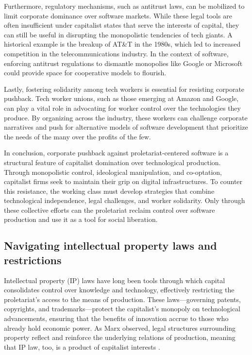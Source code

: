 \begin{refsection}
Furthermore, regulatory mechanisms, such as antitrust laws, can be mobilized to limit corporate dominance over software markets. While these legal tools are often insufficient under capitalist states that serve the interests of capital, they can still be useful in disrupting the monopolistic tendencies of tech giants. A historical example is the breakup of AT\&T in the 1980s, which led to increased competition in the telecommunications industry. In the context of software, enforcing antitrust regulations to dismantle monopolies like Google or Microsoft could provide space for cooperative models to flourish.

Lastly, fostering solidarity among tech workers is essential for resisting corporate pushback. Tech worker unions, such as those emerging at Amazon and Google, can play a vital role in advocating for worker control over the technologies they produce. By organizing across the industry, these workers can challenge corporate narratives and push for alternative models of software development that prioritize the needs of the many over the profits of the few.

In conclusion, corporate pushback against proletariat-centered software is a structural feature of capitalist domination over technological production. Through monopolistic control, ideological manipulation, and co-optation, capitalist firms seek to maintain their grip on digital infrastructures. To counter this resistance, the working class must develop strategies that combine technological independence, legal challenges, and worker solidarity. Only through these collective efforts can the proletariat reclaim control over software production and use it as a tool for social liberation.

\subsection{Navigating intellectual property laws and restrictions}

Intellectual property (IP) laws have long been tools through which capital consolidates control over knowledge and technology, effectively restricting the proletariat’s access to the means of production. These laws—governing patents, copyrights, and trademarks—protect the capitalist's monopoly on technological advancements, ensuring that the benefits of innovation accrue to those who already hold economic power. As Marx observed, legal structures surrounding property reflect and reinforce the underlying relations of production, meaning that IP law, too, is a product of capitalist interests \cite[pp.~927]{marx_capital_vol_1}.


\end{refsection}
